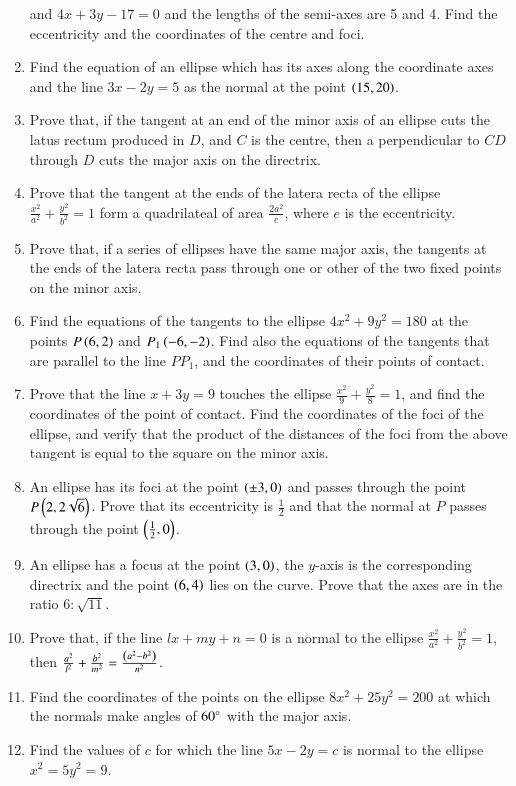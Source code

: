 \begin{enumerate}[label=\arabic*.,ref=\thesubsection.\theenumi]
and $4x+3y-17=0$ and the lengths of the semi-axes are 5 and 4.  Find the 
eccentricity and the coordinates of the centre and foci.
\item Find the equation of an ellipse which has its axes along the coordinate
axes and the line $3x-2y=5$ as the normal at the point $\left(15,20\right)$.  
\item Prove that, if the tangent at an end of the minor axis of an
ellipse cuts the latus rectum produced in $D$, and $C$ is the centre,
then a perpendicular to $CD$ through $D$ cuts the major axis on the directrix.
\item Prove that the tangent at the ends of the latera recta of the ellipse $\frac{x^2}{a^2}+\frac{y^2}{b^2}=1$
form a quadrilateal of area $\frac{2a^2}{e}$, where $e$ is the eccentricity.  
\item Prove that, if a series of ellipses have the same major axis, the tangents
at the ends of the latera recta pass through one or other of the two fixed points
on the minor axis.
\item Find the equations of the tangents to the ellipse $4x^2+9y^2 = 180$ at the
points $P \left(6,2\right)$ and $P_1 \left(-6,-2\right)$.  Find also the equations of the
tangents that are parallel to the line $PP_1$, and the coordinates of their points
of contact.
\item Prove that the line $x+3y=9$ touches the ellipse $\frac{x^2}{9} + \frac{y^2}{8} =1$,
and find the coordinates of the point of contact.  Find the coordinates of the foci of the ellipse,
and verify that the product of the distances of the foci from the above tangent is equal to the
square on the minor axis.
\item An ellipse has its foci at the point $\left(\pm 3,0\right)$ and passes through
the point $P \left(2,2\sqrt{6}\right)$.  Prove that its eccentricity is $\frac{1}{2}$ and
that the normal at $P$ passes through the point $\left(\frac{1}{2},0\right)$.
\item An ellipse has a focus at the point $\left(3,0\right)$, the $y$-axis is the corresponding
directrix and the point $\left(6,4\right)$ lies on the curve.  Prove that the axes are in the
ratio $6:\sqrt{11}$.  
\item Prove that, if the line $lx+my+n=0$ is a normal to the ellipse $\frac{x^2}{a^2}+\frac{y^2}{b^2}=1$,
then $\frac{a^2}{l^2}+\frac{b^2}{m^2} = \frac{\left(a^2-b^2\right)}{n^2}$.
\item Find the coordinates of the points on the ellipse $8x^2+25y^2 = 200$ at which the normals
make angles of $60\degree$ with the major axis.
\item Find the values of $c$ for which the line $5x-2y=c$ is normal to the ellipse $x^2=5y^2=9$.

\end{enumerate}
